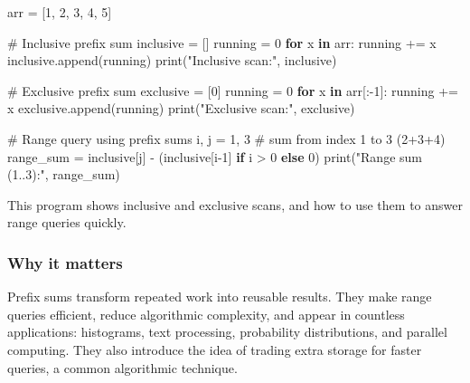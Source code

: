 \documentclass[
  letterpaper,
  DIV=11,
  numbers=noendperiod]{scrreprt}
\newenvironment{Shaded}{\begin{snugshade}}{\end{snugshade}}
\newcommand{\BuiltInTok}[1]{\textcolor[rgb]{0.00,0.23,0.31}{#1}}
\newcommand{\CommentTok}[1]{\textcolor[rgb]{0.37,0.37,0.37}{#1}}
\newcommand{\ControlFlowTok}[1]{\textcolor[rgb]{0.00,0.23,0.31}{\textbf{#1}}}
\newcommand{\DecValTok}[1]{\textcolor[rgb]{0.68,0.00,0.00}{#1}}
\newcommand{\KeywordTok}[1]{\textcolor[rgb]{0.00,0.23,0.31}{\textbf{#1}}}
\newcommand{\NormalTok}[1]{\textcolor[rgb]{0.00,0.23,0.31}{#1}}
\newcommand{\OperatorTok}[1]{\textcolor[rgb]{0.37,0.37,0.37}{#1}}
\newcommand{\StringTok}[1]{\textcolor[rgb]{0.13,0.47,0.30}{#1}}
\begin{document}
\begin{Shaded}
\begin{Highlighting}[]
\NormalTok{arr }\OperatorTok{=}\NormalTok{ [}\DecValTok{1}\NormalTok{, }\DecValTok{2}\NormalTok{, }\DecValTok{3}\NormalTok{, }\DecValTok{4}\NormalTok{, }\DecValTok{5}\NormalTok{]}

\CommentTok{\# Inclusive prefix sum}
\NormalTok{inclusive }\OperatorTok{=}\NormalTok{ []}
\NormalTok{running }\OperatorTok{=} \DecValTok{0}
\ControlFlowTok{for}\NormalTok{ x }\KeywordTok{in}\NormalTok{ arr:}
\NormalTok{    running }\OperatorTok{+=}\NormalTok{ x}
\NormalTok{    inclusive.append(running)}
\BuiltInTok{print}\NormalTok{(}\StringTok{"Inclusive scan:"}\NormalTok{, inclusive)}

\CommentTok{\# Exclusive prefix sum}
\NormalTok{exclusive }\OperatorTok{=}\NormalTok{ [}\DecValTok{0}\NormalTok{]}
\NormalTok{running }\OperatorTok{=} \DecValTok{0}
\ControlFlowTok{for}\NormalTok{ x }\KeywordTok{in}\NormalTok{ arr[:}\OperatorTok{{-}}\DecValTok{1}\NormalTok{]:}
\NormalTok{    running }\OperatorTok{+=}\NormalTok{ x}
\NormalTok{    exclusive.append(running)}
\BuiltInTok{print}\NormalTok{(}\StringTok{"Exclusive scan:"}\NormalTok{, exclusive)}

\CommentTok{\# Range query using prefix sums}
\NormalTok{i, j }\OperatorTok{=} \DecValTok{1}\NormalTok{, }\DecValTok{3}  \CommentTok{\# sum from index 1 to 3 (2+3+4)}
\NormalTok{range\_sum }\OperatorTok{=}\NormalTok{ inclusive[j] }\OperatorTok{{-}}\NormalTok{ (inclusive[i}\OperatorTok{{-}}\DecValTok{1}\NormalTok{] }\ControlFlowTok{if}\NormalTok{ i }\OperatorTok{\textgreater{}} \DecValTok{0} \ControlFlowTok{else} \DecValTok{0}\NormalTok{)}
\BuiltInTok{print}\NormalTok{(}\StringTok{"Range sum (1..3):"}\NormalTok{, range\_sum)}
\end{Highlighting}
\end{Shaded}

This program shows inclusive and exclusive scans, and how to use them to
answer range queries quickly.

\subsubsection{Why it matters}\label{why-it-matters-27}

Prefix sums transform repeated work into reusable results. They make
range queries efficient, reduce algorithmic complexity, and appear in
countless applications: histograms, text processing, probability
distributions, and parallel computing. They also introduce the idea of
trading extra storage for faster queries, a common algorithmic
technique.
\end{document}
